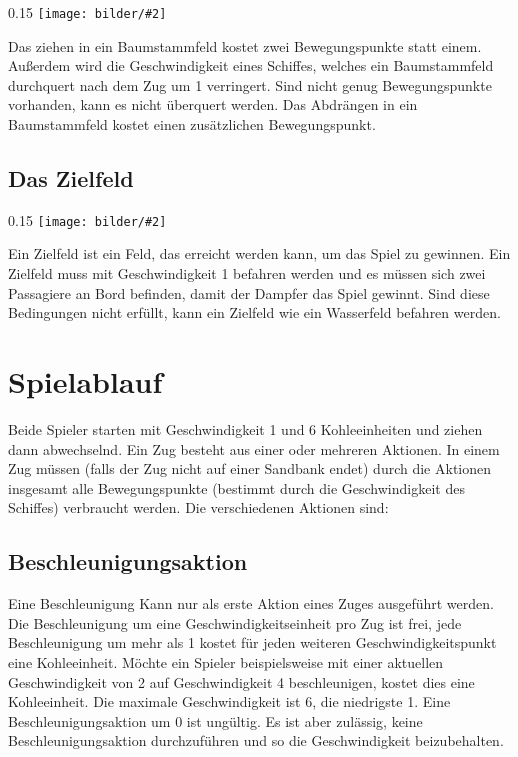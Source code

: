 \documentclass[12pt,a4paper, ngerman, oneside]{scrartcl}
\newcommand{\fieldGraphic}[2]{%
\begin{floatingfigure}[#1]{0.15\textwidth}%
  \centering
  \texttt{[image: bilder/\#2]}%
\end{floatingfigure}%
}
\begin{document}
\fieldGraphic{r}{baumstaemme}

Das ziehen in ein Baumstammfeld kostet zwei Bewegungspunkte statt einem.
Außerdem wird die Geschwindigkeit eines Schiffes, welches ein Baumstammfeld
durchquert nach dem Zug um 1 verringert. Sind nicht genug Bewegungspunkte
vorhanden, kann es nicht überquert werden. Das Abdrängen in ein Baumstammfeld
kostet einen zusätzlichen Bewegungspunkt.

\paragraph{}

\subsection{\label{goal}Das Zielfeld}

\fieldGraphic{r}{ziel}

Ein Zielfeld ist ein Feld, das erreicht werden kann, um das Spiel zu gewinnen.
Ein Zielfeld muss mit Geschwindigkeit 1 befahren werden und es müssen sich zwei
Passagiere an Bord befinden, damit der Dampfer das Spiel gewinnt. Sind diese
Bedingungen nicht erfüllt, kann ein Zielfeld wie ein Wasserfeld befahren werden.

\paragraph{}

\section{Spielablauf}

Beide Spieler starten mit Geschwindigkeit 1 und 6 Kohleeinheiten und ziehen dann
abwechselnd. Ein Zug besteht aus einer oder mehreren Aktionen. In einem Zug
müssen (falls der Zug nicht auf einer Sandbank endet) durch die Aktionen
insgesamt alle Bewegungspunkte (bestimmt durch die Geschwindigkeit des Schiffes)
verbraucht werden. Die verschiedenen Aktionen sind:


\subsection{\label{acceleration}Beschleunigungsaktion}

Eine Beschleunigung Kann nur als erste Aktion eines Zuges ausgeführt werden. Die
Beschleunigung um eine Geschwindigkeitseinheit pro Zug ist frei, jede
Beschleunigung um mehr als 1 kostet für jeden weiteren Geschwindigkeitspunkt
eine Kohleeinheit. Möchte ein Spieler beispielsweise mit einer aktuellen
Geschwindigkeit von 2 auf Geschwindigkeit 4 beschleunigen, kostet dies eine
Kohleeinheit. Die maximale Geschwindigkeit ist 6, die niedrigste 1. Eine
Beschleunigungsaktion um 0 ist ungültig. Es ist aber zulässig, keine
Beschleunigungsaktion durchzuführen und so die Geschwindigkeit beizubehalten.
\end{document}
